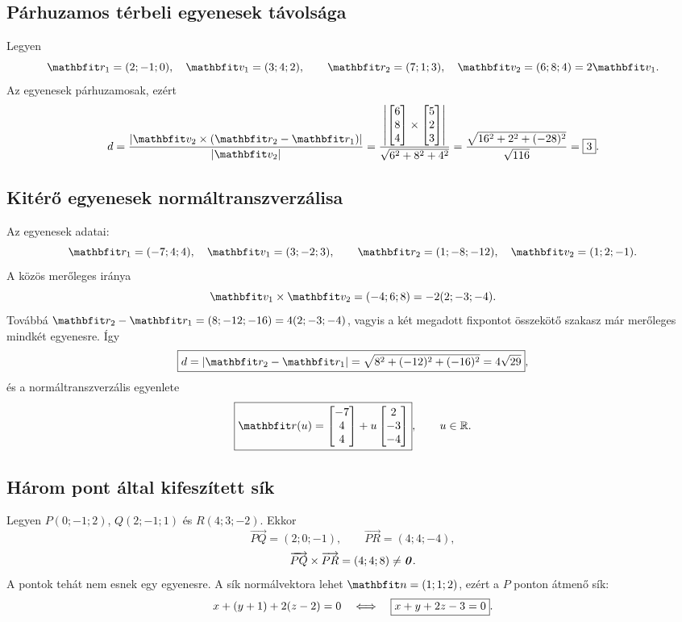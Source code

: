 \documentclass{szb-solution}
\begin{document}
\subsection{Párhuzamos térbeli egyenesek távolsága}

Legyen
$$
  \rvec r_1=(2;-1;0),\quad \rvec v_1=(3;4;2),
  \qquad
  \rvec r_2=(7;1;3),\quad \rvec v_2=(6;8;4)=2\rvec v_1
  \text.
$$
Az egyenesek párhuzamosak, ezért
$$
  d
  =\frac{|\rvec v_2\times(\rvec r_2-\rvec r_1)|}{|\rvec v_2|}
  =\frac{
    \left|\begin{bmatrix}6\\8\\4\end{bmatrix}
    \times\begin{bmatrix}5\\2\\3\end{bmatrix}\right|
  }{\sqrt{6^2+8^2+4^2}}
  =\frac{\sqrt{16^2+2^2+(-28)^2}}{\sqrt{116}}
  =\boxed{3}
  \text.
$$

\subsection{Kitérő egyenesek normáltranszverzálisa}

Az egyenesek adatai:
$$
  \rvec r_1=(-7;4;4),\quad \rvec v_1=(3;-2;3),
  \qquad
  \rvec r_2=(1;-8;-12),\quad \rvec v_2=(1;2;-1)
  \text.
$$
A közös merőleges iránya
$$
  \rvec v_1\times\rvec v_2=(-4;6;8)=-2(2;-3;-4)
  \text.
$$
Továbbá $\rvec r_2-\rvec r_1=(8;-12;-16)=4(2;-3;-4)$, vagyis a két megadott
fixpontot összekötő szakasz már merőleges mindkét egyenesre. Így
$$
  \boxed{d=|\rvec r_2-\rvec r_1|=\sqrt{8^2+(-12)^2+(-16)^2}=4\sqrt{29}}
  \text,
$$
és a normáltranszverzális egyenlete
$$
  \boxed{
    \rvec r(u)=
    \begin{bmatrix}-7\\4\\4\end{bmatrix}
    +u\begin{bmatrix}2\\-3\\-4\end{bmatrix}
  },
  \qquad u\in\Reals
  \text.
$$

\subsection{Három pont által kifeszített sík}

Legyen $P(0;-1;2)$, $Q(2;-1;1)$ és $R(4;3;-2)$. Ekkor
$$
  \overrightarrow{PQ}=(2;0;-1),
  \qquad
  \overrightarrow{PR}=(4;4;-4),
$$
$$
  \overrightarrow{PQ}\times\overrightarrow{PR}
  =(4;4;8)\neq\text{\textbf{\textit{0}}}
  \text.
$$
A pontok tehát nem esnek egy egyenesre. A sík normálvektora lehet
$\rvec n=(1;1;2)$, ezért a $P$ ponton átmenő sík:
$$
  x+(y+1)+2(z-2)=0
  \quad\Longleftrightarrow\quad
  \boxed{x+y+2z-3=0}
  \text.
$$
\end{document}
